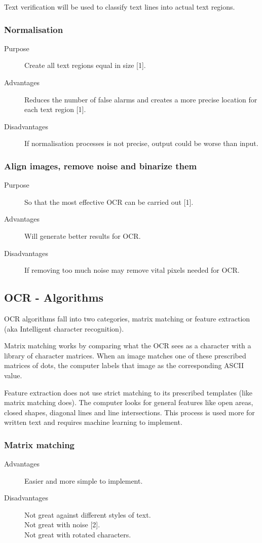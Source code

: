 \documentclass[a4paper,12pt]{article}
\begin{document}
Text verification will be used to classify text lines into actual text regions.
\subsubsection{Normalisation}
\begin{description}
\item[Purpose] Create all text regions equal in size [1].
\item[Advantages] Reduces the number of false alarms and creates a more precise location for each text region [1].
\item[Disadvantages] If normalisation processes is not precise, output could be worse than input.
\end{description}

\subsubsection{Align images, remove noise and binarize them}
\begin{description}
\item[Purpose] So that the most effective OCR can be carried out [1].
\item[Advantages] Will generate better results for OCR.
\item[Disadvantages] If removing too much noise may remove vital pixels needed for OCR.
\end{description}

\subsection{OCR - Algorithms}
OCR algorithms fall into two categories, matrix matching or feature extraction (aka Intelligent character recognition).

Matrix matching works by comparing what the OCR sees as a character with a library of character matrices. When an image matches one of these prescribed matrices of dots, the computer labels that image as the corresponding ASCII value.

Feature extraction does not use strict matching to its prescribed templates (like matrix matching does). The computer looks for general features like open areas, closed shapes, diagonal lines and line intersections. This process is used more for written text and requires machine learning to implement.

\subsubsection{Matrix matching}
\begin{description}
\item[Advantages] Easier and more simple to implement.
\item[Disadvantages] Not great against different styles of text.
\\ Not great with noise [2].
\\ Not great with rotated characters.
\end{description}
\end{document}
